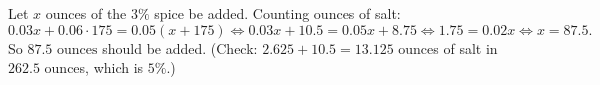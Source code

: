 Let $x$ ounces of the $3\%$ spice be added. Counting ounces of salt:
\[
0.03x+0.06\cdot175=0.05(x+175)\iff0.03x+10.5=0.05x+8.75\iff1.75=0.02x\iff x=87.5 .
\]
So $\boxed{87.5\text{ ounces}}$ should be added. (Check: $2.625+10.5=13.125$ ounces of salt in $262.5$ ounces, which is $5\%$.)
